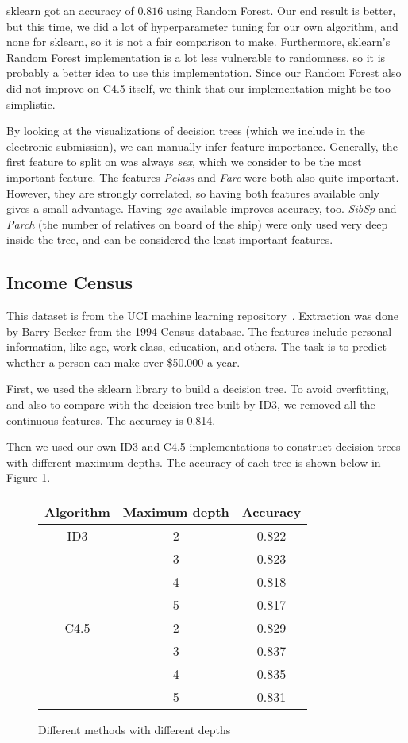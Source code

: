 \documentclass[a4paper]{article}
\begin{document}
sklearn got an accuracy of $0.816$ using Random Forest. Our end result is better, but this time, we did a lot of hyperparameter tuning for our own algorithm, and none for sklearn, so it is not a fair comparison to make. Furthermore, sklearn's Random Forest implementation is a lot less vulnerable to randomness, so it is probably a better idea to use this implementation. Since our Random Forest also did not improve on C4.5 itself, we think that our implementation might be too simplistic.

By looking at the visualizations of decision trees (which we include in the electronic submission), we can manually infer feature importance. Generally, the first feature to split on was always \emph{sex}, which we consider to be the most important feature. The features \emph{Pclass} and \emph{Fare} were both also quite important. However, they are strongly correlated, so having both features available only gives a small advantage. Having \emph{age} available improves accuracy, too. \emph{SibSp} and \emph{Parch} (the number of relatives on board of the ship) were only used very deep inside the tree, and can be considered the least important features.

\subsection{Income Census}

This dataset is from the UCI machine learning repository~\cite{census}. Extraction was done by Barry Becker from the 1994 Census database. The features include personal information, like age, work class, education, and others. The task is to predict whether a person can make over \$50.000 a year.

First, we used the sklearn library to build a decision tree. To avoid overfitting, and also to compare with the decision tree built by ID3, we removed all the continuous features. The accuracy is 0.814.

Then we used our own ID3 and C4.5 implementations to construct decision trees with different maximum depths. The accuracy of each tree is shown below in Figure \ref{fig:id3c45all}.
\begin{figure}[h]
\centering
    \begin{tabular}{c|c|c}
       Algorithm & Maximum depth & Accuracy \\
        \hline
        ID3 &2& 0.822\\
        & 3 & 0.823\\
        & 4& 0.818\\
        & 5& 0.817\\
        \hline
        C4.5 &2& 0.829\\
        &3 & 0.837\\
        &4 & 0.835\\
        &5 & 0.831\\
     \end{tabular}
     \caption{Different methods with different depths}
     \label{fig:id3c45all}
\end{figure}
\end{document}
